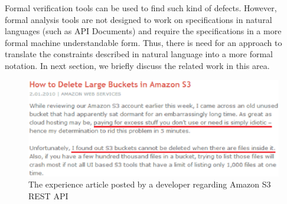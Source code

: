 Formal verification tools can be used to find such kind of defects. However, formal analysis
tools are not designed to work on specifications in natural languages (such as API Documents) and require the specifications in a more formal machine understandable form. 
Thus, there is need for an approach to translate the constraints described in natural language into a more formal notation. In next section, we briefly discuss the related work in this area.


\begin{figure}[t]
\begin{center}
\includegraphics[scale=0.4]{Example2.eps}
\end{center}
\caption{\label{fig:example2} The experience article posted by a developer regarding Amazon S3 REST API}
\end{figure}


 








